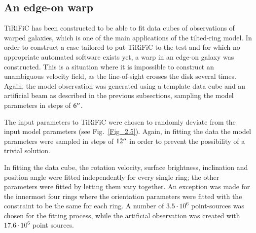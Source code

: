 \documentclass[oldversion]{aa}
\newcommand{\cng}[1]{{#1}}
\begin{document}
\subsection{An edge-on warp} \label{Sect_2.4.3} 
TiRiFiC has been
constructed to be able to fit data cubes of observations of warped
galaxies, which is one of the main applications of the tilted-ring
model. In order to construct a case tailored to put TiRiFiC to the
test and for which no appropriate \cng{automated} software exists yet, a warp in an
edge-on galaxy was constructed. This is a situation where it is
impossible to construct an unambiguous velocity field, as the
line-of-sight crosses the disk several times. Again, the model observation was generated using a template data cube and an artificial beam as described in the previous subsections, sampling the model parameters in steps of $6\hbox{$^{\prime\prime}$}$.

The input parameters to TiRiFiC were chosen to randomly deviate from the
input model parameters (see Fig.~\ref{Fig_2.5}). \cng{Again, in fitting the data the model parameters were sampled in steps of $12\hbox{$^{\prime\prime}$}$ in order to prevent the possibility of a trivial solution.}

In fitting the data cube, the rotation velocity, surface brightness,
inclination and position angle were fitted independently for every
single ring; the other parameters were fitted by letting them vary
together. An exception was made for the innermost four rings
where the orientation parameters were fitted \cng{with the constraint} to be
the same for each ring.  A number of $3.5\cdot 10^6$ point-sources was
chosen for the fitting process, while the \cng{artificial} observation was created
with $17.6\cdot10^6$ point sources.  
\end{document}
